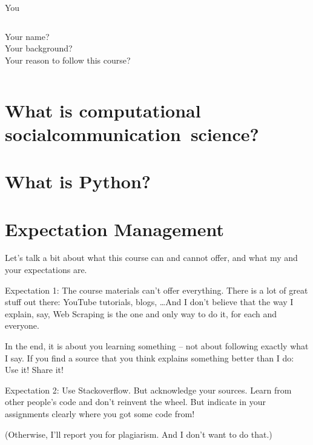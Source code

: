 \documentclass[compress]{beamer}
\begin{document}
\begin{frame}{You}
	\begin{columns}
		Your name?\\
		Your background?\\
		Your reason to follow this course?
	\end{columns}
\end{frame}



\section[What is CSS\textbar CCS?]{What is computational \lbrack social\textbar communication\rbrack  ~science?}



\section{What is Python?}







\section{Expectation Management}


\begin{frame}[standout]
	Let's talk a bit about what this course can and cannot offer, and what my and your expectations are.
\end{frame}


\begin{frame}{Expectation 1: The course materials can't offer everything.}
There is a lot of great stuff out there: YouTube tutorials, blogs, \ldots And I don't believe that the way I explain, say, Web Scraping is the one and only way to do it, for each and everyone.

In the end, it is about you learning something -- not about following exactly what I say. If you find a source that you think explains something better than I do: Use it! Share it!
\end{frame}



\begin{frame}{Expectation 2: Use Stackoverflow. But acknowledge your sources.}
Learn from other people's code and don't reinvent the wheel. But indicate in your assignments clearly where you got some code from! 

(Otherwise, I'll report you for plagiarism. And I don't want to do that.)
\end{frame}
\end{document}
